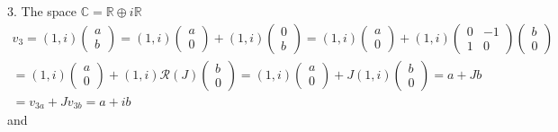 \documentclass[aps,preprint]{revtex4}
\begin{document}
3. The space $\mathbb{C=R\oplus }i\mathbb{R}$%
\begin{gather}
v_{3}=\left( 1,i\right) \left( 
\begin{array}{c}
a \\ 
b%
\end{array}%
\right) =\left( 1,i\right) \left( 
\begin{array}{c}
a \\ 
0%
\end{array}%
\right) +\left( 1,i\right) \left( 
\begin{array}{c}
0 \\ 
b%
\end{array}%
\right) =\left( 1,i\right) \left( 
\begin{array}{c}
a \\ 
0%
\end{array}%
\right) +\left( 1,i\right) \left( 
\begin{array}{cc}
0 & -1 \\ 
1 & 0%
\end{array}%
\right) \left( 
\begin{array}{c}
b \\ 
0%
\end{array}%
\right) \\
=\left( 1,i\right) \left( 
\begin{array}{c}
a \\ 
0%
\end{array}%
\right) +\left( 1,i\right) \mathcal{R}\left( J\right) \left( 
\begin{array}{c}
b \\ 
0%
\end{array}%
\right) =\left( 1,i\right) \left( 
\begin{array}{c}
a \\ 
0%
\end{array}%
\right) +J\left( 1,i\right) \left( 
\begin{array}{c}
b \\ 
0%
\end{array}%
\right) =a+Jb \\
=v_{3a}+Jv_{3b}=a+ib
\end{gather}%
and 
\end{document}
